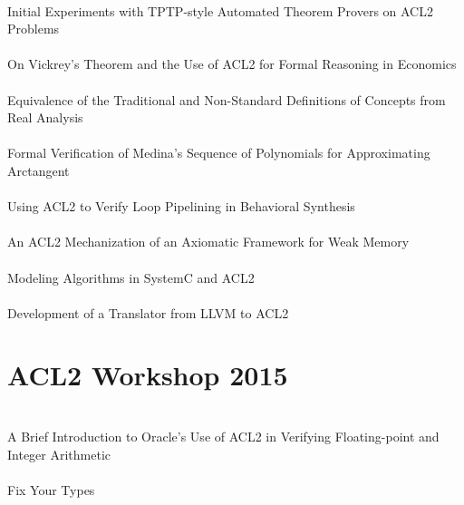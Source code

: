 \documentclass{article}
\begin{document}
\cite{14-joosten-tptp} \\
Initial Experiments with {TPTP}-style Automated Theorem Provers on {ACL2} Problems \\

\cite{14-gamboa-economics} \\
On {Vickrey}'s Theorem and the Use of {ACL2} for Formal Reasoning in Economics \\

\cite{14-cowles-equivalence} \\
Equivalence of the Traditional and Non-Standard Definitions of Concepts from Real Analysis \\

\cite{14-gamboa-arctangent} \\
Formal Verification of {Medina}'s Sequence of Polynomials for Approximating Arctangent \\

\cite{14-puri-pipelining} \\
Using {ACL2} to Verify Loop Pipelining in Behavioral Synthesis \\

\cite{14-selfridge} \\
An {ACL2} Mechanization of an Axiomatic Framework for Weak Memory \\

\cite{14-oleary-systemc} \\
Modeling Algorithms in {SystemC} and {ACL2} \\

\cite{14-hardin-llvm} \\
Development of a Translator from {LLVM} to {ACL2} \\


\section{ACL2 Workshop 2015}

\cite{15-rager-fp} \\
A Brief Introduction to {Oracle}'s Use of {ACL2} in Verifying Floating-point and Integer Arithmetic \\

\cite{15-swords-fty} \\
Fix Your Types \\
\end{document}
